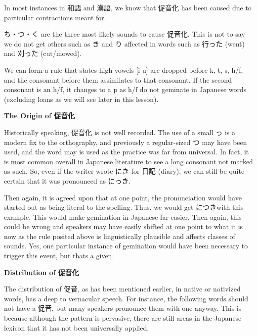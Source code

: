 \par{ In most instances in 和語 and 漢語, we know that 促音化 has been caused due to particular contractions meant for. }

\par{ ち・つ・く are the three most likely sounds to cause 促音化. This is not to say we do not get others such as き and り affected in words such as 行った (went) and 刈った (cut\slash mowed). \hfill\break
 }

\par{ We can form a rule that states high vowels [i u] are dropped before k, t, s, h\slash f, and the consonant before them assimilates to that consonant. If the second consonant is an h\slash f, it changes to a p as h\slash f do not geminate in Japanese words (excluding loans as we will see later in this lesson). }

\begin{center}
 \textbf{The Origin of 促音化 }
\end{center}

\par{ Historically speaking, 促音化 is not well recorded. The use of a small っ is a modern fix to the orthography, and previously a regular-sized つ may have been used, and the word may is used as the practice was far from universal. In fact, it is most common overall in Japanese literature to see a long consonant not marked as such. So, even if the writer wrote にき for 日記 (diary), we can still be quite certain that it was pronounced as にっき. }

\par{ Then again, it is agreed upon that at one point, the pronunciation would have started out as being literal to the spelling. Thus, we would get につきwith this example. This would make gemination in Japanese far easier. Then again, this could be wrong and speakers may have easily shifted at one point to what it is now as the rule posited above is linguistically plausible and affects classes of sounds. Yes, one particular instance of gemination would have been necessary to trigger this event, but that\textquotesingle s a given. }

\begin{center}
 \textbf{Distribution of 促音化 }
\end{center}

\par{ The distribution of 促音, as has been mentioned earlier, in native or nativized words, has a deep to vernacular speech. For instance, the following words should not have a 促音, but many speakers pronounce them with one anyway. This is because although the pattern is pervasive, there are still areas in the Japanese lexicon that it has not been universally applied. }

